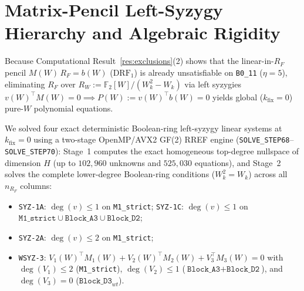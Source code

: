 \documentclass[11pt,a4paper]{article}
\theoremstyle{definition}
\newcommand{\F}{\mathbb{F}_2}
\begin{document}
\section{Matrix-Pencil Left-Syzygy Hierarchy and Algebraic Rigidity}
\label{sec:rigidity}

Because Computational Result~\ref{res:exclusions}(2) shows that the linear-in-$R_F$ pencil $M(W)\,R_F = b(W)$ ($\mathrm{DRF}_1$) is already unsatisfiable on \texttt{B0\_11} ($\eta=5$), eliminating $R_F$ over $R_W := \F[W]/(W_k^2 - W_k)$ via left syzygies $v(W)^\top M(W) = 0 \implies P(W) := v(W)^\top b(W) = 0$ yields global ($k_{\mathrm{fix}} = 0$) pure-$W$ polynomial equations.

We solved four exact deterministic Boolean-ring left-syzygy linear systems at $k_{\mathrm{fix}}=0$ using a two-stage OpenMP/AVX2 GF(2) RREF engine (\texttt{SOLVE\_STEP68}--\texttt{SOLVE\_STEP70}): Stage~1 computes the exact homogeneous top-degree nullspace of dimension $H$ (up to $102{,}960$ unknowns and $525{,}030$ equations), and Stage~2 solves the complete lower-degree Boolean-ring conditions ($W_k^2 = W_k$) across all $n_{R_F}$ columns:
\begin{itemize}
  \item \texttt{SYZ-1A}: $\deg(v) \le 1$ on \texttt{M1\_strict}; \quad \texttt{SYZ-1C}: $\deg(v) \le 1$ on $\texttt{M1\_strict} \cup \texttt{Block\_A3} \cup \texttt{Block\_D2}$;
  \item \texttt{SYZ-2A}: $\deg(v) \le 2$ on \texttt{M1\_strict};
  \item \texttt{WSYZ-3}: $V_1(W)^\top M_1(W) + V_2(W)^\top M_2(W) + V_3^\top M_3(W) = 0$ with $\deg(V_1) \le 2$ (\texttt{M1\_strict}), $\deg(V_2) \le 1$ ($\texttt{Block\_A3}+\texttt{Block\_D2}$), and $\deg(V_3)=0$ ($\texttt{Block\_D3}_{wt}$).
\end{itemize}
\end{document}
